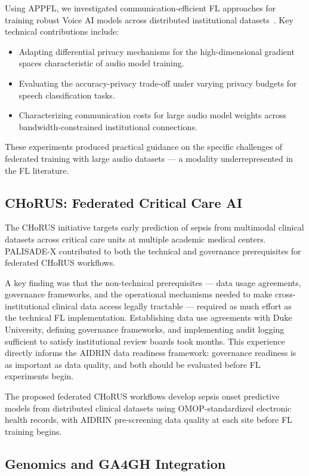 \documentclass[conference]{IEEEtran}
\begin{document}
Using APPFL, we investigated communication-efficient FL approaches for training robust Voice AI models across distributed institutional datasets~\cite{b2ai_voice_fl}. Key technical contributions include:
\begin{itemize}
    \item Adapting differential privacy mechanisms for the high-dimensional gradient spaces characteristic of audio model training.
    \item Evaluating the accuracy-privacy trade-off under varying privacy budgets for speech classification tasks.
    \item Characterizing communication costs for large audio model weights across bandwidth-constrained institutional connections.
\end{itemize}

These experiments produced practical guidance on the specific challenges of federated training with large audio datasets — a modality underrepresented in the FL literature.

\subsection{CHoRUS: Federated Critical Care AI}

The CHoRUS initiative targets early prediction of sepsis from multimodal clinical datasets across critical care units at multiple academic medical centers. PALISADE-X contributed to both the technical and governance prerequisites for federated CHoRUS workflows.

A key finding was that the non-technical prerequisites — data usage agreements, governance frameworks, and the operational mechanisms needed to make cross-institutional clinical data access legally tractable — required as much effort as the technical FL implementation. Establishing data use agreements with Duke University, defining governance frameworks, and implementing audit logging sufficient to satisfy institutional review boards took months. This experience directly informs the AIDRIN data readiness framework: governance readiness is as important as data quality, and both should be evaluated before FL experiments begin.

The proposed federated CHoRUS workflows develop sepsis onset predictive models from distributed clinical datasets using OMOP-standardized electronic health records, with AIDRIN pre-screening data quality at each site before FL training begins.

\subsection{Genomics and GA4GH Integration}
\end{document}
